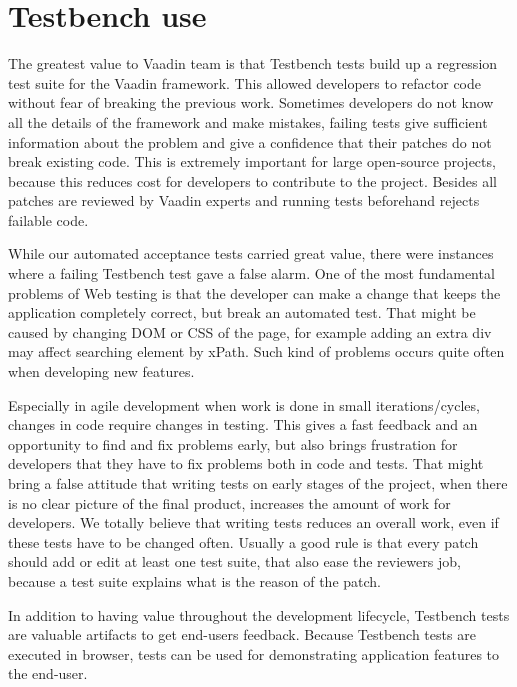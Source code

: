 \chapter{Testbench use}
\label{ch:testbenchuse}
The greatest value to Vaadin team is that Testbench tests 
build up a regression test suite for the Vaadin framework. This allowed developers to refactor
 code without fear of breaking the previous work. Sometimes developers do not know all the details
 of the framework and make mistakes, failing tests give sufficient information about the problem 
 and give a confidence that their patches do not break existing code.  
 This is extremely important for large open-source projects,
  because this reduces cost for developers to contribute to the project.
   Besides all patches are reviewed by Vaadin experts and running tests beforehand rejects failable code. 

While our automated acceptance tests carried great value, there were instances
 where a failing Testbench test gave a false alarm. One of the most fundamental
  problems of Web testing is that the developer can make a change that keeps
   the application completely correct, but break an automated test. 
   That might be caused by changing DOM or CSS of the page, for example adding
    an extra div may affect searching element by xPath. Such kind of problems 
    occurs quite often when developing new features. 

Especially in agile development when work is done in small iterations/cycles, 
changes in code require changes in testing. This gives a fast feedback and
 an opportunity to find and fix problems early, but also brings frustration
  for developers that they have to fix problems both in code and tests. 
  That might bring a false attitude that writing tests on early stages of the project,
   when there is no clear picture of the final product,
    increases the amount of work for developers. 
    We totally believe that writing tests reduces an overall work,
     even if these tests have to be changed often.
      Usually a good rule is that every patch should add or edit at least one test suite, that
       also ease the reviewers job, because a test suite explains what is the reason of the patch. 

In addition to having value throughout the development lifecycle,
Testbench tests are valuable artifacts to get end-users feedback.
Because Testbench tests are executed in browser, tests can be used 
for demonstrating application features to the end-user. 
  
